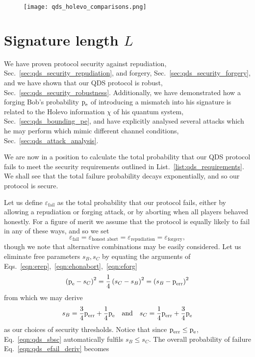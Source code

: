 
\begin{figure}
\texttt{[image: qds\_holevo\_comparisons.png]}
\caption{\label{fig:qds_holevo_comparisons}}
\end{figure}


\section{Signature length $L$}\label{sec:qds_siglength}
We have proven protocol security against repudiation, Sec.~\ref{sec:qds_security_repudiation}, and forgery, Sec.~\ref{sec:qds_security_forgery}, and we have shown that our QDS protocol is robust, Sec.~\ref{sec:qds_security_robustness}. Additionally, we have demonstrated how a forging Bob's probability $\text{p}_{\text{e}}$ of introducing a mismatch into his signature is related to the Holevo information $\chi$ of his quantum system, Sec.~\ref{sec:qds_bounding_pe}, and have explicitly analysed several attacks which he may perform which mimic different channel conditions, Sec.~\ref{sec:qds_attack_analysis}.

We are now in a position to calculate the total probability that our QDS protocol fails to meet the security requirements outlined in List.~\ref{list:qds_requirements}. We shall see that the total failure probability decays exponentially, and so our protocol is secure.

Let us define $\varepsilon_{\text{fail}}$ as the total probability that our protocol fails, either by allowing a repudiation or forging attack, or by aborting when all players behaved honestly. For a figure of merit we assume that the protocol is equally likely to fail in any of these ways, and so we set
\begin{equation}\label{eqn:qds_efail_deriv}
\varepsilon_{\text{fail}} = \varepsilon_{\text{honest abort}} = \varepsilon_{\text{repudiation}} = \varepsilon_{\text{forgery}},
\end{equation}
though we note that alternative combinations may be easily considered. Let us eliminate free parameters $s_B, s_C$ by equating the arguments of Eqs.~\ref{eqn:erep},~\ref{eqn:ehonabort},~\ref{eqn:eforg}
\begin{equation}
\left(\text{p}_{\text{e}} - s_C\right)^2  = \frac{1}{4}\left(s_C - s_B\right)^2 = \left(s_B - \text{p}_{\text{err}}\right)^2
\end{equation}
from which we may derive
\begin{equation}\label{eqn:qds_sbsc}
s_B = \frac{3}{4} \perr + \frac{1}{4}\pe \qq{and} s_C = \frac{1}{4}\perr + \frac{3}{4}\pe
\end{equation}
as our choices of security thresholds. Notice that since $\text{p}_{\text{err}} \le \text{p}_{\text{e}}$, Eq.~\ref{eqn:qds_sbsc} automatically fulfils $s_B \le s_C$. The overall probability of failure Eq.~\ref{eqn:qds_efail_deriv} becomes

